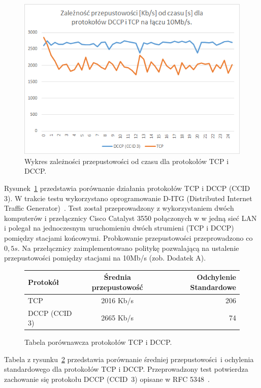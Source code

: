 \begin{figure}[h!]
	\centering
		\includegraphics{TCP_DCCP}
	\caption{Wykres zależności przepustowości od czasu dla protokołów TCP i DCCP.}
	\label{TCP_DCCP}
\end{figure}

Rysunek~\ref{TCP_DCCP} przedstawia porównanie działania protokołów TCP i DCCP (CCID 3). W trakcie testu wykorzystano oprogramowanie D-ITG (Distributed Internet Traffic Generator)~\cite{D-ITG}. Test został przeprowadzony z wykorzystaniem dwóch komputerów i przełącznicy Cisco Catalyst 3550 połączonych w w jedną sieć LAN i polegał na jednoczesnym uruchomieniu dwóch strumieni (TCP i DCCP) pomiędzy stacjami końcowymi. Probkowanie przepustowości przeprowadzono co $0,5s$. Na przełącznicy zaimplementowano politykę pozwalającą na ustalenie przepustowości pomiędzy stacjami na 10Mb/s (zob. Dodatek A).

\begin{figure}[h!]
	\centering
	\begin{tabular}{ l | c | r }
  		Protokół & Średnia przepustowość & Odchylenie Standardowe \\
  		\hline
  		TCP & 2016 Kb/s & 206 \\
  		DCCP (CCID 3) & 2665 Kb/s & 74 \\
	\end{tabular}
	\caption{Tabela porównawcza protokołów TCP i DCCP.}
	\label{TCP_DCCP_table}
\end{figure}

Tabela z rysunku~\ref{TCP_DCCP_table} przedstawia porównanie średniej przepustowości~i ochylenia standardowego dla protokołów TCP i DCCP. Przeprowadzony test potwierdza zachowanie się protokołu DCCP (CCID~3) opisane w RFC 5348~\cite{RFC5348}. 

